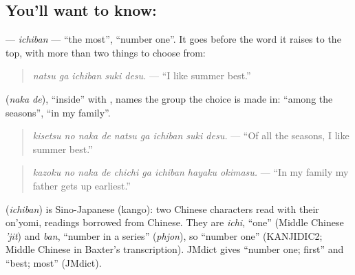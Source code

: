 \subsection*{You'll want to know: }
\textbf{} — \emph{ichiban} — \textquotedblleft{}the most\textquotedblright{}, \textquotedblleft{}number one\textquotedblright{}. It goes before the word it raises to the top, with more than two things to choose from:

\begin{quote}
\textbf{  }
\end{quote}

\begin{quote}
\emph{natsu ga ichiban suki desu.} — \textquotedblleft{}I like summer best.\textquotedblright{}
\end{quote}

\textbf{} (\emph{naka de}), \textquotedblleft{}inside\textquotedblright{} with \textbf{}, names the group the choice is made in: \textquotedblleft{}among the seasons\textquotedblright{}, \textquotedblleft{}in my family\textquotedblright{}.

\begin{quote}
\textbf{    }
\end{quote}

\begin{quote}
\emph{kisetsu no naka de natsu ga ichiban suki desu.} — \textquotedblleft{}Of all the seasons, I like summer best.\textquotedblright{}
\end{quote}

\begin{quote}
\textbf{     }
\end{quote}

\begin{quote}
\emph{kazoku no naka de chichi ga ichiban hayaku okimasu.} — \textquotedblleft{}In my family my father gets up earliest.\textquotedblright{}
\end{quote}

\begin{cousinweb}
\textbf{} (\emph{ichiban}) is Sino-Japanese (kango): two Chinese characters read with their on'yomi, readings borrowed from Chinese. They are \emph{ichi}, \textquotedblleft{}one\textquotedblright{} (Middle Chinese \emph{'jit}) and \emph{ban}, \textquotedblleft{}number in a series\textquotedblright{} (\emph{phjon}), so \textquotedblleft{}number one\textquotedblright{} (KANJIDIC2; Middle Chinese in Baxter's transcription). JMdict gives \textquotedblleft{}number one; first\textquotedblright{} and \textquotedblleft{}best; most\textquotedblright{} (JMdict).
\end{cousinweb}

